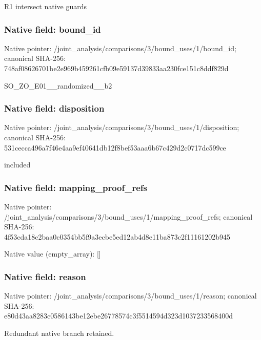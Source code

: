\documentclass[10pt,a4paper]{article}
\begin{document}
\begingroup\raggedright\sloppy R1 intersect native guards\par\endgroup

\subsubsection{Native field: bound\_\allowbreak{}id}
Native pointer: /joint\_\allowbreak{}analysis/comparisons/3/bound\_\allowbreak{}uses/1/bound\_\allowbreak{}id; canonical SHA-256: 748af08626701be2e969b459261cfb09e59137d39833aa230fce151c8ddf829d

\begingroup\raggedright\sloppy SO\_\allowbreak{}ZO\_\allowbreak{}E01\_\allowbreak{}\_\allowbreak{}randomized\_\allowbreak{}\_\allowbreak{}b2\par\endgroup

\subsubsection{Native field: disposition}
Native pointer: /joint\_\allowbreak{}analysis/comparisons/3/bound\_\allowbreak{}uses/1/disposition; canonical SHA-256: 531cecca496a7f46e4aa9ef40641db12f8bef53aaa6b67c429d2c0717dc599ce

\begingroup\raggedright\sloppy included\par\endgroup

\subsubsection{Native field: mapping\_\allowbreak{}proof\_\allowbreak{}refs}
Native pointer: /joint\_\allowbreak{}analysis/comparisons/3/bound\_\allowbreak{}uses/1/mapping\_\allowbreak{}proof\_\allowbreak{}refs; canonical SHA-256: 4f53cda18c2baa0c0354bb5f9a3ecbe5ed12ab4d8e11ba873c2f11161202b945

Native value (empty\_\allowbreak{}array): []

\subsubsection{Native field: reason}
Native pointer: /joint\_\allowbreak{}analysis/comparisons/3/bound\_\allowbreak{}uses/1/reason; canonical SHA-256: e80d43aa8283c0586143be12ebe26778574c3f5514594d323d1037233568400d

\begingroup\raggedright\sloppy Redundant native branch retained.\par\endgroup
\end{document}
